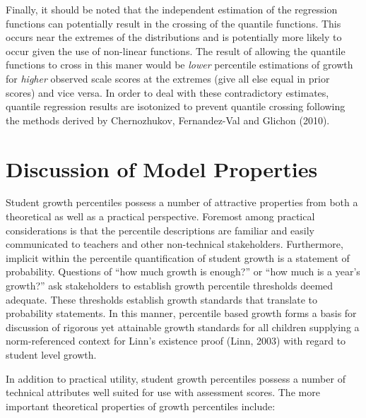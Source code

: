 \documentclass[12pt]{article}
\begin{document}
Finally, it should be noted that the independent estimation of the
regression functions can potentially result in the crossing of the
quantile functions. This occurs near the extremes of the distributions
and is potentially more likely to occur given the use of non-linear
functions. The result of allowing the quantile functions to cross in
this maner would be \emph{lower} percentile estimations of growth for
\emph{higher} observed scale scores at the extremes (give all else equal
in prior scores) and vice versa. In order to deal with these
contradictory estimates, quantile regression results are isotonized to
prevent quantile crossing following the methods derived by Chernozhukov,
Fernandez-Val and Glichon (2010).

\pagebreak

\section{Discussion of Model
Properties}\label{discussion-of-model-properties}

Student growth percentiles possess a number of attractive properties
from both a theoretical as well as a practical perspective. Foremost
among practical considerations is that the percentile descriptions are
familiar and easily communicated to teachers and other non-technical
stakeholders. Furthermore, implicit within the percentile quantification
of student growth is a statement of probability. Questions of ``how much
growth is enough?'' or ``how much is a year's growth?'' ask stakeholders
to establish growth percentile thresholds deemed adequate. These
thresholds establish growth standards that translate to probability
statements. In this manner, percentile based growth forms a basis for
discussion of rigorous yet attainable growth standards for all children
supplying a norm-referenced context for Linn's existence proof (Linn,
2003) with regard to student level growth.

In addition to practical utility, student growth percentiles possess a
number of technical attributes well suited for use with assessment
scores. The more important theoretical properties of growth percentiles
include:
\end{document}
